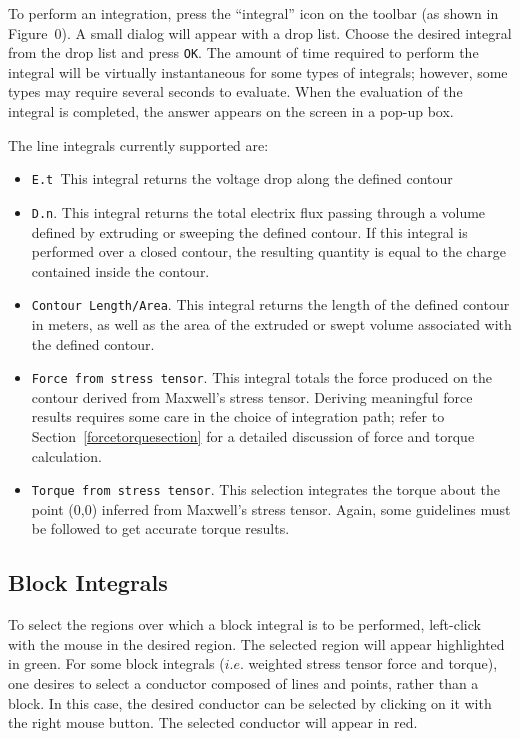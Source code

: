 \documentclass[12pt]{report}
\begin{document}
To perform an integration, press the ``integral'' icon on the
toolbar (as shown in Figure~0). A small dialog will appear with a
drop list. Choose the desired integral from the drop list and press
\texttt{OK}. The amount of time required to perform the integral
will be virtually instantaneous for some types of integrals;
however, some types may require several seconds to evaluate. When
the evaluation of the integral is completed, the answer appears on
the screen in a pop-up box.

The line integrals currently supported are:


\begin{itemize}


\item \texttt{E.t }This integral returns the voltage drop along the defined
contour

\item \texttt{D.n}. This integral returns the total electrix flux passing through
a volume defined by extruding or sweeping the defined contour. If this
integral is performed over a closed contour, the resulting quantity is equal
to the charge contained inside the contour.

\item \texttt{Contour Length/Area}. This integral returns the length of the
defined contour in meters, as well as the area of the extruded or swept
volume associated with the defined contour.

\item \texttt{Force from stress tensor}. This integral totals the force produced
on the contour derived from Maxwell's stress tensor. Deriving
meaningful force results requires some care in the choice of
integration path; refer to Section~\ref{forcetorquesection} for a
detailed discussion of force and torque calculation.

\item \texttt{Torque from stress tensor}. This selection integrates the torque
about the point (0,0) inferred from Maxwell's stress tensor. Again,
some guidelines must be followed to get accurate torque results.

\end{itemize}



\subsection{Block Integrals}

To select the regions over which a block integral is to be performed,
left-click with the mouse in the desired region. The selected region will
appear highlighted in green. For some block integrals ($i.e.$ weighted stress
tensor force and torque), one desires to select a conductor composed of
lines and points, rather than a block. In this case, the desired conductor
can be selected by clicking on it with the right mouse button. The selected
conductor will appear in red.
\end{document}
